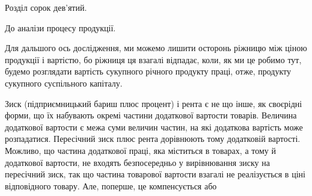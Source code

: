 Розділ сорок дев’ятий.

До аналізи процесу продукції.

Для дальшого ось дослідження, ми можемо лишити осторонь ріжницю між
ціною продукції і вартістю, бо ріжниця ця взагалі відпадає, коли, як ми це
робимо тут, будемо розглядати вартість сукупного річного продукту праці, отже,
продукту сукупного суспільного капіталу.

Зиск (підприємницький бариш плюс процент) і рента є не що інше, як
своєрідні форми, що їх набувають окремі частини додаткової вартости товарів.
Величина додаткової вартости є межа суми величин частин, на які додаткова
вартість може розпадатися. Пересічний зиск плюс рента дорівнюють
тому додатковій вартості. Можливо, що частина додаткової праці, яка міститься
в товарах, а тому й додаткової вартости, не входять безпосередньо у вирівнювання
зиску на пересічний зиск, так що частина товарової вартости взагалі не
реалізується в ціні відповідного товару. Але, поперше, це компенсується або
